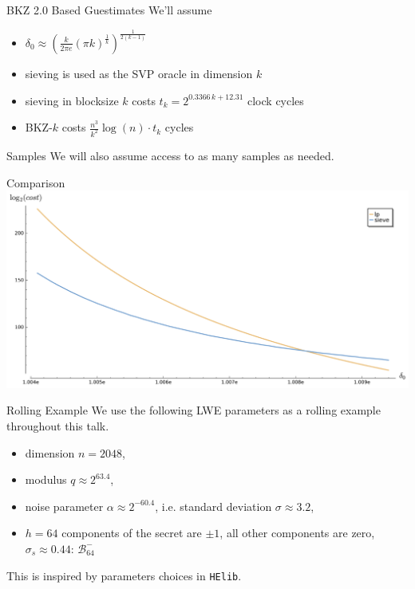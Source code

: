 \documentclass[presentation,smaller]{beamer}
\renewcommand{\B}[2][]{\ensuremath{\mathcal{B}_{#1}^{#2}}\xspace}
\begin{document}
\begin{frame}[label={sec:orgheadline20}]{BKZ 2.0 Based Guestimates}
We’ll assume 

\begin{itemize}
\item \(δ_0 ≈ {\left( \frac{k}{2 \pi e} {(π k)}^{\frac{1}{k}}  \right)}^{\frac{1}{2(k-1)}}\)
\item sieving is used as the SVP oracle in dimension \(k\)
\item sieving in blocksize \(k\) costs \(t_k = 2^{0.3366\,k + 12.31}\) clock cycles
\item BKZ-\(k\) costs \(\frac{n^3}{k^2} \log(n) \cdot t_k\) cycles
\end{itemize}

\begin{block}{Samples}
We will also assume access to as many samples as needed.
\end{block}
\end{frame}

\begin{frame}[label={sec:orgheadline21}]{Comparison}
\includegraphics[width=1.0\textwidth]{lp_vs_sieve.png}
\end{frame}


\begin{frame}[fragile,label={sec:orgheadline22}]{Rolling Example}
 We use the following LWE parameters as a rolling example throughout this talk.

\begin{itemize}
\item dimension \(n=2048\),
\item modulus \(q ≈ 2^{63.4}\),
\item noise parameter \(\alpha ≈ 2^{-60.4}\), i.e. standard deviation \(σ ≈ 3.2\),
\item \(h=64\) components of the secret are \(\pm 1\), all other components are zero, \(σ_s ≈ 0.44\): \(\B[64]{-}\)
\end{itemize}

This is inspired by parameters choices in \texttt{HElib}.
\end{frame}
\end{document}
